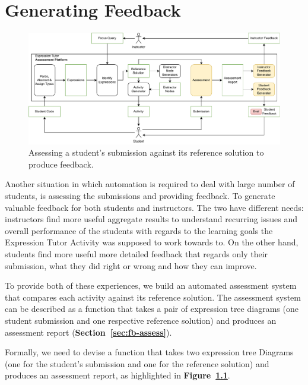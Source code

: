 \chapter{Generating Feedback}\label{sec:fb}

\begin{chapterBody}

\begin{figure}[ht]
    \centering
    \includegraphics[width=\textwidth]{res/7/et_loop_assessment.pdf}
    \caption{Assessing a student's submission against its reference solution to
produce feedback.}
    \label{fig:fb-intro-loop}
\end{figure}


Another situation in which automation is required to deal with large number of
students, is assessing the submissions and providing feedback.
To generate valuable feedback for both students and instructors.
The two have different needs: instructors find more useful aggregate results
to understand recurring issues and overall performance of the students with
regards to the learning goals the Expression Tutor Activity was supposed
to work towards to.
On the other hand, students find more useful more detailed feedback that
regards only their submission, what they did right or wrong and how they
can improve.

To provide both of these experiences, we build an automated assessment
system that compares each activity against its reference solution.
The assessment system can be described as a function that takes a
pair of expression tree diagrams (one student submission and one
respective reference solution) and produces an assessment report
(\textbf{Section~\ref{sec:fb-assess}}).

Formally, we need to devise a function that takes two expression tree
Diagrams (one for the student's submission and one for the reference
solution) and produces an assessment report, as highlighted in
\textbf{Figure~\ref{fig:fb-intro-loop}}.


\end{chapterBody}
